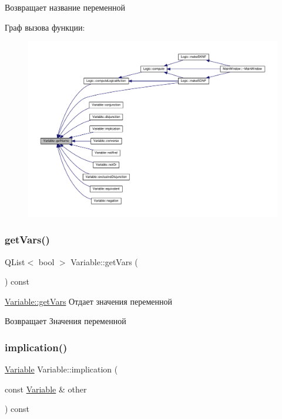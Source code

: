 \begin{DoxyReturn}{Возвращает}
название переменной 
\end{DoxyReturn}
Граф вызова функции\+:\nopagebreak
\begin{figure}[H]
\begin{center}
\leavevmode
\includegraphics[width=350pt]{class_variable_a7e2bd08aff707fb67d67ce1914e9bb48_icgraph}
\end{center}
\end{figure}
\mbox{\label{class_variable_a43a45b7c410b176f3240ac1630495c8d}} 
\subsubsection{\texorpdfstring{get\+Vars()}{getVars()}}
{\footnotesize\ttfamily Q\+List$<$ bool $>$ Variable\+::get\+Vars (\begin{DoxyParamCaption}{ }\end{DoxyParamCaption}) const}



\hyperlink{class_variable_a43a45b7c410b176f3240ac1630495c8d}{Variable\+::get\+Vars} Отдает значения переменной 

\begin{DoxyReturn}{Возвращает}
Значения переменной 
\end{DoxyReturn}
\mbox{\label{class_variable_a82a20d70ad58a132b487a7bc822b47d1}} 
\subsubsection{\texorpdfstring{implication()}{implication()}}
{\footnotesize\ttfamily \hyperlink{class_variable}{Variable} Variable\+::implication (\begin{DoxyParamCaption}\item[{const \hyperlink{class_variable}{Variable} \&}]{other }\end{DoxyParamCaption}) const}



